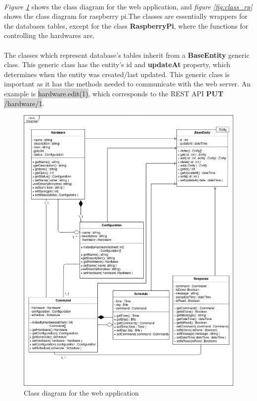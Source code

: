 \documentclass[12pt, oneside, a4paper]{book}
\newcommand{\code}[1]{{\color{red}\colorbox{lightgray}{#1}}}
\begin{document}
					\paragraph{} \textit{Figure \ref{fig:class_web}} shows the class diagram for the web application, and \textit{figure \ref{fig:class_rp}} shows the class diagram for raspberry pi.The classes are essentially wrappers for the databases tables, except for the class \textbf{RaspberryPi}, where the functions for controlling the hardwares are.
					\paragraph{}The classes which represent database's tables inherit from a \textbf{BaseEntity} generic class. This generic class has the entity's id and \textbf{updateAt} property, which determines when the entity was created/last updated. This generic class is important as it has the methods needed to communicate with the web server. An example is \code{hardware.edit(1)}, which corresponds to the REST API \textbf{PUT} \code{/hardware/1}.
					\begin{figure}[H]
						\caption{Class diagram for the web application}
						\label{fig:class_web}
						\includegraphics[width=\linewidth]{img/diagram_class1.png}
					\end{figure}
\end{document}
